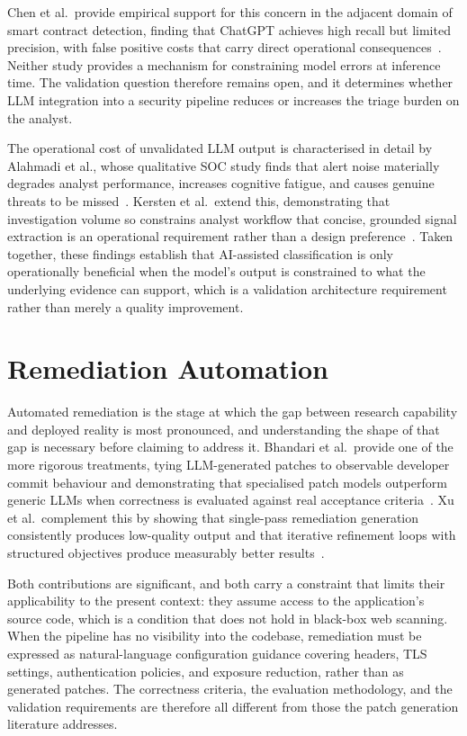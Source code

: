 \documentclass[12pt, a4paper, oneside]{report}
\begin{document}
Chen et al.\ provide empirical support for this concern in the adjacent
domain of smart contract detection, finding that ChatGPT achieves high
recall but limited precision, with false positive costs that carry
direct operational consequences~\cite{chen2024}. Neither study provides
a mechanism for constraining model errors at inference time. The
validation question therefore remains open, and it determines whether
LLM integration into a security pipeline reduces or increases the triage
burden on the analyst.

The operational cost of unvalidated LLM output is characterised in
detail by Alahmadi et al., whose qualitative SOC study finds that alert
noise materially degrades analyst performance, increases cognitive
fatigue, and causes genuine threats to be missed~\cite{alahmadi2022}.
Kersten et al.\ extend this, demonstrating that investigation volume so
constrains analyst workflow that concise, grounded signal extraction is
an operational requirement rather than a design preference~\cite{kersten2026}.
Taken together, these findings establish that AI-assisted classification
is only operationally beneficial when the model's output is constrained
to what the underlying evidence can support, which is a validation
architecture requirement rather than merely a quality improvement.

\section{Remediation Automation}

Automated remediation is the stage at which the gap between research
capability and deployed reality is most pronounced, and understanding
the shape of that gap is necessary before claiming to address it.
Bhandari et al.\ provide one of the more rigorous treatments, tying
LLM-generated patches to observable developer commit behaviour and
demonstrating that specialised patch models outperform generic LLMs when
correctness is evaluated against real acceptance criteria~\cite{bhandari2025}.
Xu et al.\ complement this by showing that single-pass remediation
generation consistently produces low-quality output and that iterative
refinement loops with structured objectives produce measurably better
results~\cite{xu2025}.

Both contributions are significant, and both carry a constraint that
limits their applicability to the present context: they assume access to
the application's source code, which is a condition that does not hold
in black-box web scanning. When the pipeline has no visibility into the
codebase, remediation must be expressed as natural-language
configuration guidance covering headers, TLS settings, authentication
policies, and exposure reduction, rather than as generated patches.
The correctness criteria, the evaluation methodology, and the validation
requirements are therefore all different from those the patch generation
literature addresses.
\end{document}
